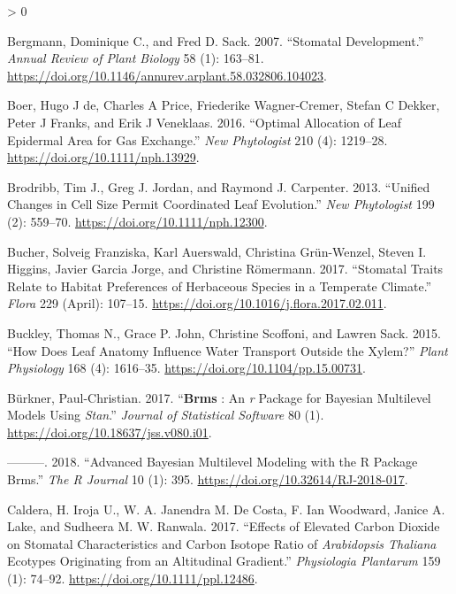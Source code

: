 \documentclass[
  10pt,
]{article}
\newlength{\cslhangindent}
\newenvironment{CSLReferences}[2] %
 {%
  \setlength{\parindent}{0pt}
  \ifodd #1 \everypar{\setlength{\hangindent}{\cslhangindent}}\ignorespaces\fi
  \ifnum #2 > 0
  \setlength{\parskip}{#2\baselineskip}
  \fi
 }%
 {}
\begin{document}
\begin{CSLReferences}{1}{0}
\leavevmode\hypertarget{ref-bergmann_stomatal_2007}{}%
Bergmann, Dominique C., and Fred D. Sack. 2007. {``Stomatal {Development}.''} \emph{Annual Review of Plant Biology} 58 (1): 163--81. \url{https://doi.org/10.1146/annurev.arplant.58.032806.104023}.

\leavevmode\hypertarget{ref-de_boer_optimal_2016}{}%
Boer, Hugo J de, Charles A Price, Friederike Wagner‐Cremer, Stefan C Dekker, Peter J Franks, and Erik J Veneklaas. 2016. {``Optimal Allocation of Leaf Epidermal Area for Gas Exchange.''} \emph{New Phytologist} 210 (4): 1219--28. \url{https://doi.org/10.1111/nph.13929}.

\leavevmode\hypertarget{ref-brodribb_unified_2013}{}%
Brodribb, Tim J., Greg J. Jordan, and Raymond J. Carpenter. 2013. {``Unified Changes in Cell Size Permit Coordinated Leaf Evolution.''} \emph{New Phytologist} 199 (2): 559--70. \url{https://doi.org/10.1111/nph.12300}.

\leavevmode\hypertarget{ref-bucher_stomatal_2017}{}%
Bucher, Solveig Franziska, Karl Auerswald, Christina Grün-Wenzel, Steven I. Higgins, Javier Garcia Jorge, and Christine Römermann. 2017. {``Stomatal Traits Relate to Habitat Preferences of Herbaceous Species in a Temperate Climate.''} \emph{Flora} 229 (April): 107--15. \url{https://doi.org/10.1016/j.flora.2017.02.011}.

\leavevmode\hypertarget{ref-buckley_how_2015}{}%
Buckley, Thomas N., Grace P. John, Christine Scoffoni, and Lawren Sack. 2015. {``How {Does} {Leaf} {Anatomy} {Influence} {Water} {Transport} Outside the {Xylem}?''} \emph{Plant Physiology} 168 (4): 1616--35. \url{https://doi.org/10.1104/pp.15.00731}.

\leavevmode\hypertarget{ref-burkner_brms_2017}{}%
Bürkner, Paul-Christian. 2017. {``\textbf{Brms} : {An} \emph{r} {Package} for {Bayesian} {Multilevel} {Models} {Using} \emph{Stan}.''} \emph{Journal of Statistical Software} 80 (1). \url{https://doi.org/10.18637/jss.v080.i01}.

\leavevmode\hypertarget{ref-burkner_advanced_2018}{}%
---------. 2018. {``Advanced {Bayesian} {Multilevel} {Modeling} with the {R} {Package} Brms.''} \emph{The R Journal} 10 (1): 395. \url{https://doi.org/10.32614/RJ-2018-017}.

\leavevmode\hypertarget{ref-caldera_effects_2017}{}%
Caldera, H. Iroja U., W. A. Janendra M. De Costa, F. Ian Woodward, Janice A. Lake, and Sudheera M. W. Ranwala. 2017. {``Effects of Elevated Carbon Dioxide on Stomatal Characteristics and Carbon Isotope Ratio of \emph{{Arabidopsis} Thaliana} Ecotypes Originating from an Altitudinal Gradient.''} \emph{Physiologia Plantarum} 159 (1): 74--92. \url{https://doi.org/10.1111/ppl.12486}.


\end{CSLReferences}
\end{document}
